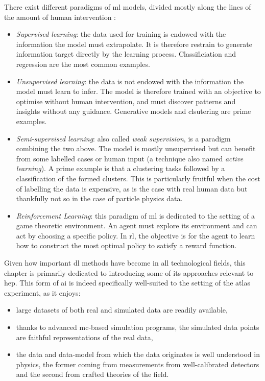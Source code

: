 There exist different paradigms of \gls{ml} models, divided mostly along the lines of the amount of human intervention \cite{Murphy_ML}:
\begin{itemize}
    \item \textit{Supervised learning}: the data used for training is endowed with the information the model must extrapolate. It is therefore restrain to generate information target directly by the learning process. Classificiation and regression are the most common examples.
    \item \textit{Unsupervised learning}: the data is not endowed with the information the model must learn to infer. The model is therefore trained with an objective to optimise without human intervention, and must discover patterns and insights without any guidance. Generative models and clsutering are prime examples.
    \item \textit{Semi-supervised learning}: also called \textit{weak supervision}, is a paradigm combining the two above. The model is mostly unsupervised but can benefit from some labelled cases or human input (a technique also named \textit{active learning}). A prime example is that a clustering tasks followed by a classification of the formed clusters. This is particularly fruitful when the cost of labelling the data is expensive, as is the case with real human data but thankfully not so in the case of particle physics data.
    \item\textit{Reinforcement Learning}: this paradigm of \gls{ml} is dedicated to the setting of a game theoretic environment. An agent must explore its environment and can act by choosing a specific policy. In \gls{rl}, the objective is for the agent to learn how to construct the most optimal policy to satisfy a reward function.
\end{itemize}

Given how important \gls{dl} methods have become in all technological fields, this chapter is primarily dedicated to introducing some of its approaches relevant to \gls{hep}. This form of \gls{ai} is indeed specifically well-suited to the setting of the \gls{atlas} experiment, as it enjoys:
\begin{itemize}
    \item large datasets of both real and simulated data are readily available,
    \item thanks to advanced \gls{mc}-based simulation programs, the simulated data points are faithful representations of the real data,
    \item the data and data-model from which the data originates is well understood in physics, the former coming from measurements from well-calibrated detectors and the second from crafted theories of the field. 
\end{itemize}



